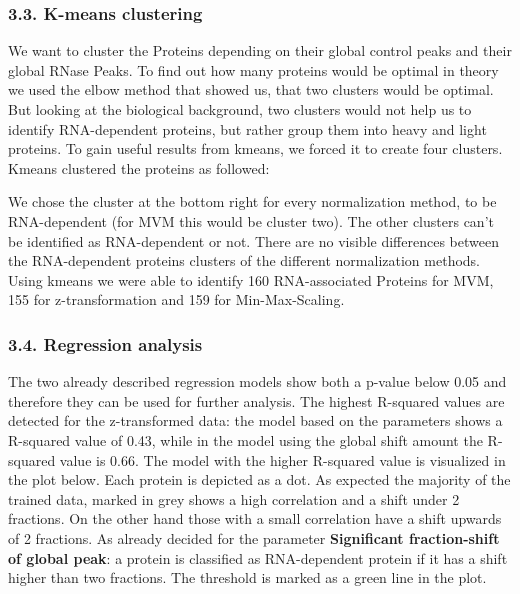 \documentclass[
  12pt,
]{article}
\begin{document}
\hypertarget{k-means-clustering-1}{%
\subsubsection{3.3. K-means clustering}\label{k-means-clustering-1}}

We want to cluster the Proteins depending on their global control peaks
and their global RNase Peaks. To find out how many proteins would be
optimal in theory we used the elbow method that showed us, that two
clusters would be optimal. But looking at the biological background, two
clusters would not help us to identify RNA-dependent proteins, but
rather group them into heavy and light proteins. To gain useful results
from kmeans, we forced it to create four clusters. Kmeans clustered the
proteins as followed:

We chose the cluster at the bottom right for every normalization method,
to be RNA-dependent (for MVM this would be cluster two). The other
clusters can't be identified as RNA-dependent or not. There are no
visible differences between the RNA-dependent proteins clusters of the
different normalization methods. Using kmeans we were able to identify
160 RNA-associated Proteins for MVM, 155 for z-transformation and 159
for Min-Max-Scaling.

\hypertarget{regression-analysis-1}{%
\subsubsection{3.4. Regression analysis}\label{regression-analysis-1}}

The two already described regression models show both a p-value below
0.05 and therefore they can be used for further analysis. The highest
R-squared values are detected for the z-transformed data: the model
based on the parameters shows a R-squared value of 0.43, while in the
model using the global shift amount the R-squared value is 0.66. The
model with the higher R-squared value is visualized in the plot below.
Each protein is depicted as a dot. As expected the majority of the
trained data, marked in grey shows a high correlation and a shift under
2 fractions. On the other hand those with a small correlation have a
shift upwards of 2 fractions. As already decided for the parameter
\textbf{Significant fraction-shift of global peak}: a protein is
classified as RNA-dependent protein if it has a shift higher than two
fractions. The threshold is marked as a green line in the plot.
\end{document}

